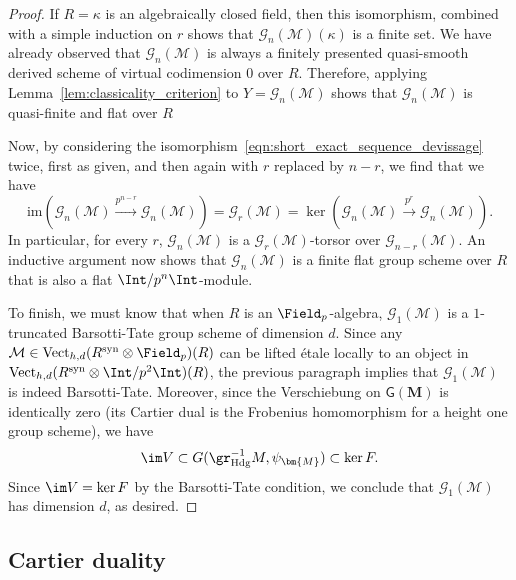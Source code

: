 \documentclass[10pt]{amsart}
\begin{document}
\begin{proof}
If $R = \kappa$ is an algebraically closed field, then this isomorphism, combined with a simple induction on $r$ shows that $\mathcal{G}_n(\mathcal{M})(\kappa)$ is a finite set. We have already observed that $\mathcal{G}_n(\mathcal{M})$ is always a finitely presented quasi-smooth derived scheme of virtual codimension $0$ over $R$. Therefore, applying Lemma~\ref{lem:classicality_criterion} to $Y = \mathcal{G}_n(\mathcal{M})$ shows that $\mathcal{G}_n(\mathcal{M})$ is quasi-finite and flat over $R$


Now, by considering the isomorphism~\eqref{eqn:short_exact_sequence_devissage} twice, first as given, and then again with $r$ replaced by $n-r$, we find that we have
\[
 \mathrm{im}\left(\mathcal{G}_n(\mathcal{M})\xrightarrow{p^{n-r}}\mathcal{G}_n(\mathcal{M})\right) = \mathcal{G}_r(\mathcal{M}) = \ker\left(\mathcal{G}_n(\mathcal{M})\xrightarrow{p^r}\mathcal{G}_n(\mathcal{M})\right).
\]
In particular, for every $r$, $\mathcal{G}_n(\mathcal{M})$ is a $\mathcal{G}_r(\mathcal{M})$-torsor over $\mathcal{G}_{n-r}(\mathcal{M})$. An inductive argument now shows that $\mathcal{G}_n(\mathcal{M})$ is a finite flat group scheme over $R$ that is also a flat $\Int/p^n\Int$-module. 

To finish, we must know that when $R$ is an $\Field_p$-algebra, $\mathcal{G}_1(\mathcal{M})$ is a $1$-truncated Barsotti-Tate group scheme of dimension $d$. Since any $\mathcal{M}\in \mathrm{Vect}_{h,d}(R^{\mathrm{syn}}\otimes\Field_p)(R)$ can be lifted \'etale locally to an object in $\mathrm{Vect}_{h,d}(R^{\mathrm{syn}}\otimes\Int/p^2\Int)(R)$, the previous paragraph implies that $\mathcal{G}_1(\mathcal{M})$ is indeed Barsotti-Tate. Moreover, since the Verschiebung on $\mathsf{G}(\bm{M})$ is identically zero (its Cartier dual is the Frobenius homomorphism for a height one group scheme), we have 
\[
\im V \subset G(\gr^{-1}_{\mathrm{Hdg}}M,\psi_{\bm{M}})\subset \ker F.
\]
Since $\im V = \ker F$ by the Barsotti-Tate condition, we conclude that $\mathcal{G}_1(\mathcal{M})$ has dimension $d$, as desired.
 \end{proof}



\subsection{Cartier duality}
\end{document}
